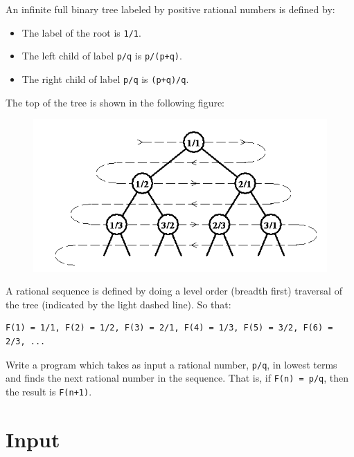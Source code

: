 
\noindent
An infinite full binary tree labeled by positive rational numbers is defined by:

\begin{itemize}
    \item The label of the root is \texttt{1/1}.
    \item The left child of label \texttt{p/q} is \texttt{p/(p+q)}.
    \item The right child of label \texttt{p/q} is \texttt{(p+q)/q}.
\end{itemize}

The top of the tree is shown in the following figure:

\begin{figure}[!h]
    \begin{center}
        \includegraphics[]{f1.png} \\
    \end{center}
\end{figure}

A rational sequence is defined by doing a level order (breadth first)
traversal of the tree (indicated by the light dashed line).  So that:

\begin{verbatim}
F(1) = 1/1, F(2) = 1/2, F(3) = 2/1, F(4) = 1/3, F(5) = 3/2, F(6) = 2/3, ...
\end{verbatim}

Write a program which takes as input a rational number, \texttt{p/q}, in 
lowest terms and finds the next rational number in the 
sequence. That is, if  \texttt{F(n) = p/q}, then the result is \texttt{F(n+1)}.

\section*{Input}

